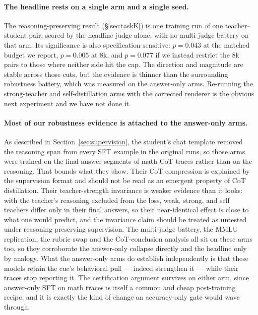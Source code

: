\documentclass{article}
\begin{document}
\paragraph{The headline rests on a single arm and a single seed.} The
reasoning-preserving result (\S\ref{sec:taskK}) is one training run of one
teacher--student pair, scored by the headline judge alone, with no multi-judge
battery on that arm. Its significance is also specification-sensitive:
$p = 0.043$ at the matched budget we report, $p = 0.005$ at 8k, and $p = 0.077$
if we instead restrict the 8k pairs to those where neither side hit the cap.
The direction and magnitude are stable across those cuts,
but the evidence is thinner than the surrounding robustness battery, which was
measured on the answer-only arms. Re-running the strong-teacher and
self-distillation arms with the corrected renderer is the obvious next
experiment and we have not done it.

\paragraph{Most of our robustness evidence is attached to the answer-only
arms.} As described in Section~\ref{sec:supervision}, the student's chat
template removed the reasoning span from every SFT example in the original
runs, so those arms were trained on the final-answer segments of math CoT
traces rather than on the reasoning. That bounds what they show. Their CoT
compression is explained by the supervision format and should not be read as an
emergent property of CoT distillation. Their teacher-strength invariance is
weaker evidence than it looks: with the teacher's reasoning excluded from the
loss, weak, strong, and self teachers differ only in their final answers, so
their near-identical effect is close to what one would predict, and the
invariance claim should be treated as untested under reasoning-preserving
supervision. The multi-judge battery, the MMLU replication, the rubric swap
and the CoT-conclusion analysis all sit on these arms too, so they corroborate
the answer-only collapse directly and the headline only by analogy. What the
answer-only arms do establish independently is that these models retain the
cue's behavioral pull --- indeed strengthen it --- while their traces stop
reporting it. The certification argument survives on either arm, since
answer-only SFT on math traces is itself a common and cheap post-training
recipe, and it is exactly the kind of change an accuracy-only gate would wave
through.
\end{document}
